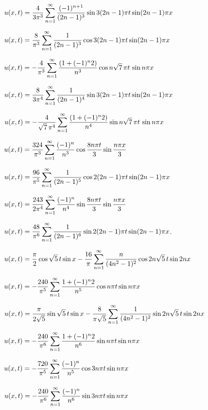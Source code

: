 \medskip

$u(x,t)=\displaystyle\frac{4}{3\pi^{3}}\sum_{n=1}^{\infty}
\frac{(-1)^{n+1}}{(2n-1)^{3}}\sin3(2n-1)\pi t\sin(2n-1)\pi x$

$u(x,t)=\displaystyle\frac{8}{\pi^{3}}\sum_{n=1}^{\infty}\frac{1}{(2n-1)^{3}}
\cos3(2n-1)\pi t\sin(2n-1)\pi x$

$u(x,t)=\displaystyle-\frac{4}{\pi^{3}}\sum_{n=1}^{\infty}\frac{(1+(-1)^{n}2)}{n^{3}}
\cos n\sqrt{7}\,\pi t\,\sin n\pi x$

$u(x,t)=\displaystyle\frac{8}{3\pi^{4}}\sum_{n=1}^{\infty}\frac{1}{(2n-1)^{4}}
\sin3(2n-1)\pi t\sin(2n-1)\pi x$

$u(x,t)=\displaystyle-\frac{4}{\sqrt{7}\,\pi^{4}}\sum_{n=1}^{\infty}\frac{(1+(-1)^{n}2)}{n^{4}}
\sin n\sqrt{7}\,\pi t\,\sin n\pi x$

$u(x,t)=\displaystyle\frac{324}{\pi^{3}}\sum_{n=1}^{\infty}\frac{(-1)^{n}}{n^{3}}\cos\frac{8n\pi t}{3}\sin\frac{n\pi x}{3}$

$u(x,t)=\displaystyle\frac{96}{\pi^{5}}\sum_{n=1}^{\infty}\frac{1}{(2n-1)^{5}}
\cos2(2n-1)\pi t\sin(2n-1)\pi x$

$u(x,t)=\displaystyle\frac{243}{2\pi^{4}}\sum_{n=1}^{\infty}\frac{(-1)^{n}}{n^{4}}\sin\frac{8n\pi t}{3}\sin\frac{n\pi x}{3}$

$u(x,t)=\displaystyle\frac{48}{\pi^{6}}\sum_{n=1}^{\infty}\frac{1}{(2n-1)^{6}}
\sin2(2n-1)\pi t\sin(2n-1)\pi x$.

$u(x,t)=\displaystyle\frac{\pi}{2}\cos\sqrt{5}\,t\sin x-\frac{16}{\pi}
\sum_{n=1}^{\infty}\frac{n}{(4n^{2}-1)^{2}}\cos2n\sqrt{5}\,t\sin2nx$

$u(x,t)=\displaystyle-\frac{240}{\pi^{5}}\sum_{n=1}^{\infty}\frac{1+(-1)^{n}2}{n^{5}}
\cos n\pi t\sin n\pi x$

$u(x,t)=\displaystyle\frac{\pi}{2\sqrt{5}}\sin\sqrt{5}\,t\sin x-\frac{8}{\pi\sqrt{5}}
\sum_{n=1}^{\infty}\frac{1}{(4n^{2}-1)^{2}}\sin2n\sqrt{5}\,t\sin2nx$

$u(x,t)=\displaystyle-\frac{240}{\pi^{6}}\sum_{n=1}^{\infty}\frac{1+(-1)^{n}2}{n^{6}}
\sin n\pi t\sin n\pi x$

$u(x,t)=\displaystyle-\frac{720}{\pi^{5}}\sum_{n=1}^{\infty}\frac{(-1)^{n}}{n^{5}}
\cos3n\pi t\sin n\pi x$

$u(x,t)=\displaystyle-\frac{240}{\pi^{6}}\sum_{n=1}^{\infty}\frac{(-1)^{n}}{n^{6}}
\sin3n\pi t\sin n\pi x$

